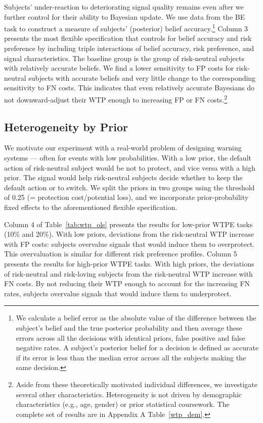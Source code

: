 \documentclass[12pt,a4paper]{article}
\begin{document}
Subjects' under-reaction to deteriorating signal quality remains even after we further control for their ability to Bayesian update. We use data from the BE task to construct a measure of subjects' (posterior) belief accuracy.\footnote{We calculate a belief error as the absolute value of the difference between the subject's belief and the true posterior probability and then average these errors across all the decisions with identical priors, false positive and false negative rates. A subject's posterior belief for a decision is defined as accurate if its error is less than the median error across all the subjects making the same decision.} Column 3 presents the most flexible specification that controls for belief accuracy and risk preference by including triple interactions of belief accuracy, risk preference, and signal characteristics. The baseline group is the group of risk-neutral subjects with relatively accurate beliefs. We find a lower sensitivity to FP costs for risk-neutral subjects with accurate beliefs and very little change to the corresponding sensitivity to FN costs. This indicates that even relatively accurate Bayesians do not downward-adjust their WTP enough to increasing FP or FN costs.\footnote{Aside from these theoretically motivated individual differences, we investigate several other characteristics. Heterogeneity is not driven by demographic characteristics (e.g., age, gender) or prior statistical coursework.  The complete set of results are in Appendix A Table~\ref{wtp_dem}.}
  

\subsection{Heterogeneity by Prior}

We motivate our experiment with a real-world problem of designing warning systems --- often for events with low probabilities. With a low prior, the default action of risk-neutral subject would be not to protect, and vice versa with a high prior. The signal would help risk-neutral subjects decide whether to keep the default action or to switch. We split the priors in two groups using the threshold of 0.25 (= protection cost/potential loss), and we incorporate prior-probability fixed effects to the aforementioned flexible specification. 

Column 4 of Table~\ref{tab:wtp_ols} presents the results for low-prior WTPE tasks (10\% and 20\%). With low priors, deviations from the risk-neutral WTP increase with FP costs: subjects overvalue signals that would induce them to overprotect. This overvaluation is similar for different risk preference profiles. Column 5 presents the results for high-prior WTPE tasks. With high priors, the deviations of risk-neutral and risk-loving subjects from the risk-neutral WTP increase with FN costs. By not reducing their WTP enough to account for the increasing FN rates, subjects overvalue signals that would induce them to underprotect. 
\end{document}
